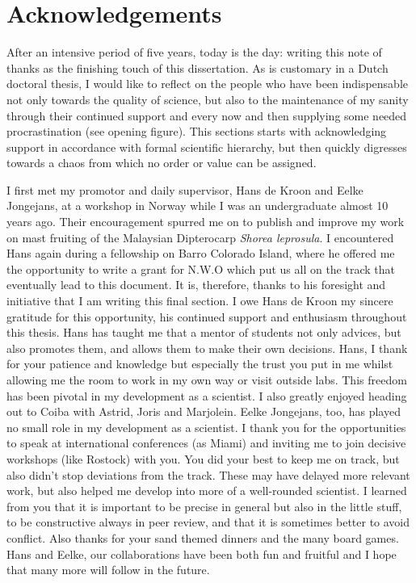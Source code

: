 \documentclass[b5paper,justified]{tufte-book} %
\begin{document}
\begin{fullwidth}
\begin{figure}
\begin{minipage}{14cm}
\end{minipage}

\end{figure}



\chapter{Acknowledgements}
After an intensive period of five years, today is the day: writing this note of thanks as the finishing touch of this dissertation. As is customary in a Dutch doctoral thesis, I would like to reflect on the people who have been indispensable not only towards the quality of science, but also to the maintenance of my sanity through their continued support and every now and then supplying some needed procrastination (see opening figure). This sections starts with acknowledging support in accordance with formal scientific hierarchy, but then quickly digresses towards a chaos from which no order or value can be assigned. 

I first met my promotor and daily supervisor, Hans de Kroon and Eelke Jongejans, at a workshop in Norway while I was an undergraduate almost 10 years ago.  Their encouragement spurred me on to publish and improve my work on mast fruiting of the Malaysian Dipterocarp \textit{Shorea leprosula}. I encountered Hans again during a fellowship on Barro Colorado Island, where he offered me the opportunity to write a grant for N.W.O which put us all on the track that eventually lead to this document. It is, therefore, thanks to his foresight and initiative that I am writing this final section. I owe Hans de Kroon my sincere gratitude for this opportunity, his continued support and enthusiasm throughout this thesis.  Hans has taught me that a mentor of students not only advices, but also promotes them, and allows them to make their own decisions. Hans, I thank for your patience and knowledge but especially the trust you put in me whilst allowing me the room to work in my own way or visit outside labs. This freedom has been pivotal in my development as a scientist. I also greatly enjoyed heading out to Coiba with Astrid, Joris and Marjolein. Eelke Jongejans, too, has played no small role in my development as a scientist. I thank you for the opportunities to speak at international conferences (as Miami) and inviting me to join decisive workshops (like Rostock) with you. You did your best to keep me on track, but also didn't stop deviations from the track. These may have delayed more relevant work, but also helped me develop into more of a well-rounded scientist.  I learned from you that it is important to be precise in general but also in the little stuff, to be constructive always in peer review, and that it is sometimes better to avoid conflict. Also thanks for your sand themed dinners and the many board games. Hans and Eelke, our collaborations have been both fun and fruitful and I hope that many more will follow in the future.


\end{fullwidth}
\end{document}
